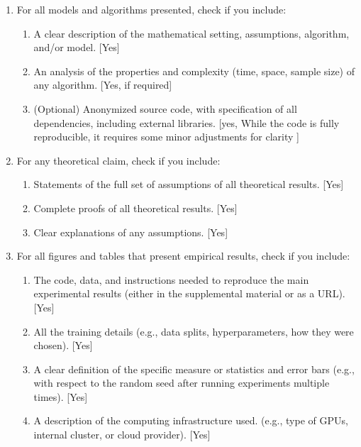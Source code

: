  \begin{enumerate}


 \item For all models and algorithms presented, check if you include:
 \begin{enumerate}
   \item A clear description of the mathematical setting, assumptions, algorithm, and/or model. [Yes]
   \item An analysis of the properties and complexity (time, space, sample size) of any algorithm. [Yes, if required]
   \item (Optional) Anonymized source code, with specification of all dependencies, including external libraries. [yes, While the code is fully reproducible, it requires some minor adjustments for clarity ]
 \end{enumerate}


 \item For any theoretical claim, check if you include:
 \begin{enumerate}
   \item Statements of the full set of assumptions of all theoretical results. [Yes]
   \item Complete proofs of all theoretical results. [Yes]
   \item Clear explanations of any assumptions. [Yes]     
 \end{enumerate}


 \item For all figures and tables that present empirical results, check if you include:
 \begin{enumerate}
   \item The code, data, and instructions needed to reproduce the main experimental results (either in the supplemental material or as a URL). [Yes]
   \item All the training details (e.g., data splits, hyperparameters, how they were chosen). [Yes]
         \item A clear definition of the specific measure or statistics and error bars (e.g., with respect to the random seed after running experiments multiple times). [Yes]
         \item A description of the computing infrastructure used. (e.g., type of GPUs, internal cluster, or cloud provider). [Yes]
 \end{enumerate}


\end{enumerate}
